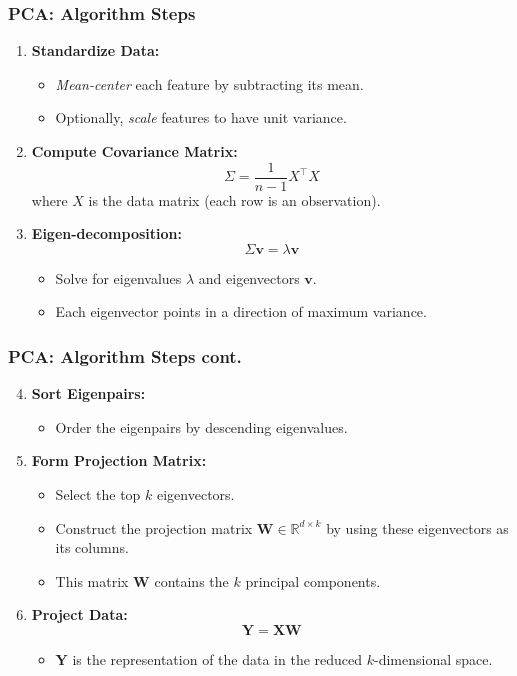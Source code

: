 \documentclass[aspectratio=169]{beamer}
\begin{document}
\begin{frame}
    \frametitle{PCA: Algorithm Steps}
    \begin{enumerate}
        \item \textbf{Standardize Data:} 
            \begin{itemize}
                \item \emph{Mean-center} each feature by subtracting its mean.
                \item Optionally, \emph{scale} features to have unit variance.
            \end{itemize}
        \item \textbf{Compute Covariance Matrix:}
            \[
            \Sigma = \frac{1}{n-1} X^\top X
            \]
            where \(X\) is the data matrix (each row is an observation).
        \item \textbf{Eigen-decomposition:}
            \[
            \Sigma \mathbf{v} = \lambda \mathbf{v}
            \]
            \begin{itemize}
                \item Solve for eigenvalues \(\lambda\) and eigenvectors \(\mathbf{v}\).
                \item Each eigenvector points in a direction of maximum variance.
            \end{itemize}

        \end{enumerate}
\end{frame}
    

\begin{frame}
    \frametitle{PCA: Algorithm Steps cont.}
\begin{enumerate}
\setcounter{enumi}{3}
\item \textbf{Sort Eigenpairs:}
\begin{itemize}
    \item Order the eigenpairs by descending eigenvalues.
\end{itemize}
\item \textbf{Form Projection Matrix:}
\begin{itemize}
    \item Select the top \( k \) eigenvectors.
    \item Construct the projection matrix \(\mathbf{W} \in \mathbb{R}^{d \times k}\) by using these eigenvectors as its columns.
    \item This matrix \(\mathbf{W}\) contains the \( k \) principal components.
\end{itemize}
\item \textbf{Project Data:}
\[
\mathbf{Y} = \mathbf{XW}
\]
\begin{itemize}
    \item \(\mathbf{Y}\) is the representation of the data in the reduced \( k \)-dimensional space.
\end{itemize}
\end{enumerate}
\end{frame}
    
\end{document}
